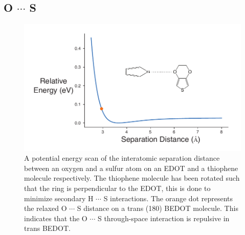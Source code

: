 \subsection{\texorpdfstring{O $\cdots$ S}{OS}}
\begin{figure}[hbt!]
    \centering
    \includegraphics{figures/append_aroma/ts_t_edot_copy.pdf}
    \caption[\texorpdfstring{O $\cdots$ S}{OS} Through-space Calculation]{A potential energy scan of the interatomic separation distance between an oxygen and a sulfur atom on an EDOT and a thiophene molecule respectively. The thiophene molecule has been rotated such that the ring is perpendicular to the EDOT, this is done to minimize secondary H $\cdots$ S interactions. The orange dot represents the relaxed O $\cdots$ S distance on a trans (180\textdegree) BEDOT molecule. This indicates that the O $\cdots$ S through-space interaction is repulsive in trans BEDOT.}
    \label{fig:ts_t_edot}
\end{figure}
\clearpage


